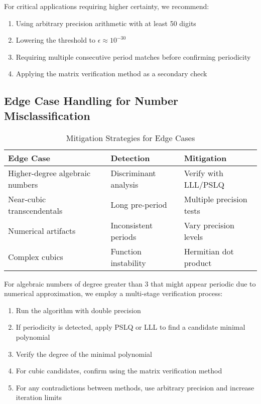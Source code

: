For critical applications requiring higher certainty, we recommend:
\begin{enumerate}
\item Using arbitrary precision arithmetic with at least 50 digits
\item Lowering the threshold to $\epsilon \approx 10^{-30}$
\item Requiring multiple consecutive period matches before confirming periodicity
\item Applying the matrix verification method as a secondary check
\end{enumerate}

\subsection{Edge Case Handling for Number Misclassification}

\begin{table}[htbp]
\centering
\small
\caption{Mitigation Strategies for Edge Cases}
\label{tab:edge_case_mitigation}
\begin{tabular}{|p{2.5cm}|p{2.5cm}|p{2.5cm}|}
\hline
\textbf{Edge Case} & \textbf{Detection} & \textbf{Mitigation} \\
\hline
Higher-degree algebraic numbers & Discriminant analysis & Verify with LLL/PSLQ \\
\hline
Near-cubic transcendentals & Long pre-period & Multiple precision tests \\
\hline
Numerical artifacts & Inconsistent periods & Vary precision levels \\
\hline
Complex cubics & Function instability & Hermitian dot product \\
\hline
\end{tabular}
\end{table}

For algebraic numbers of degree greater than 3 that might appear periodic due to numerical approximation, we employ a multi-stage verification process:
\begin{enumerate}
\item Run the \HAPD{} algorithm with double precision
\item If periodicity is detected, apply PSLQ or LLL to find a candidate minimal polynomial
\item Verify the degree of the minimal polynomial
\item For cubic candidates, confirm using the matrix verification method
\item For any contradictions between methods, use arbitrary precision and increase iteration limits
\end{enumerate}

